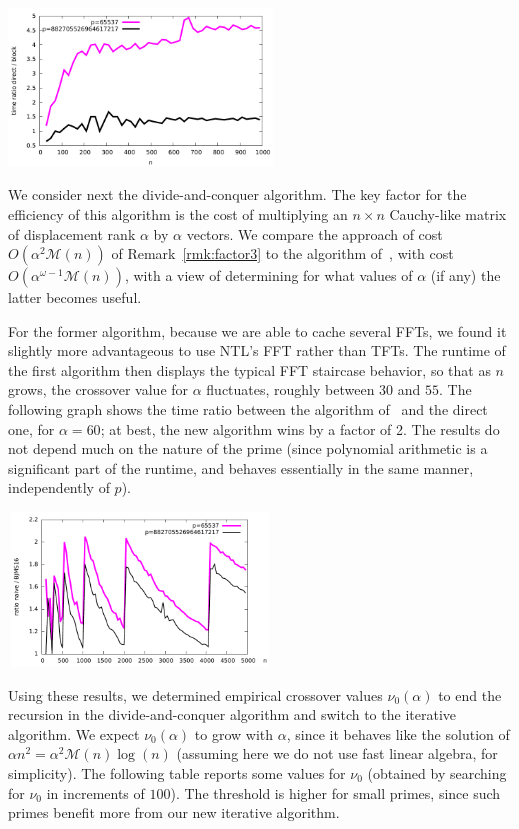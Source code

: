 \documentclass[sigconf]{acmart}
\newcommand{\M}{\ensuremath{\mathscr{M}}}
\theoremstyle{acmdefinition}
\begin{document}
\includegraphics[width=7cm]{ratio-block-eschost-desktop.pdf}

We consider next the divide-and-conquer algorithm. The key factor for
the efficiency of this algorithm is the cost of multiplying an $n
\times n$ Cauchy-like matrix of displacement rank $\alpha$ by $\alpha$
vectors. We compare the approach of cost $O(\alpha^2 \M(n))$ of
Remark~\ref{rmk:factor3} to the algorithm of~\cite{BoJeMoSc16}, with
cost $O(\alpha^{\omega-1} \M(n))$, with a view of determining for what
values of $\alpha$ (if any) the latter becomes useful.

For the former algorithm, because we are able to cache several FFTs,
we found it slightly more advantageous to use NTL's FFT rather than
TFTs. The runtime of the first algorithm then displays the typical FFT
staircase behavior, so that as $n$ grows, the crossover value for $\alpha$
fluctuates, roughly between $30$ and $55$. The following graph shows
the time ratio between the algorithm of~\cite{BoJeMoSc16} and the
direct one, for $\alpha=60$; at best, the new algorithm wins by a
factor of 2. The results do not depend much on the nature of the prime
(since polynomial arithmetic is a significant part of the runtime, and
behaves essentially in the same manner, independently of $p$).

\includegraphics[width=7cm,height=4.1cm]{ratio-mul-matrix-eschost-desktop.pdf}

Using these results, we determined empirical crossover values
$\nu_0(\alpha)$ to end the recursion in the divide-and-conquer
algorithm and switch to the iterative algorithm. We expect
$\nu_0(\alpha)$ to grow with $\alpha$, since it
behaves like the solution of $\alpha n^2 = \alpha^2 \M(n) \log(n)$
(assuming here we do not use fast linear algebra, for simplicity). The
following table reports some values for $\nu_0$ (obtained by searching
for $\nu_0$ in increments of $100$).  The threshold is higher for
small primes, since such primes benefit more from our new iterative
algorithm.
\end{document}
